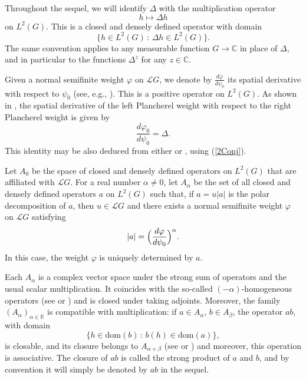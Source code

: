 \documentclass[12pt]{amsart}
\newcommand{\Cdb}{\mbox{$\mathbb{C}$}}
\theoremstyle{remark}
\theoremstyle{definition}
\numberwithin{equation}{section}
\begin{document}
Throughout the sequel, we will identify $\Delta$ with the multiplication operator 
\[
h \mapsto \Delta h
\] 
on $L^2(G)$. This is a closed and densely defined operator with domain 
\[
\{ h \in L^2(G) \,:\, \Delta h \in L^2(G) \}.
\] 
The same convention applies to any measurable function $G \to \Cdb$ in place of $\Delta$, and in particular to the functions $\Delta^z$ for any $z \in \Cdb$.

Given a normal semifinite weight $\varphi$ on $\mathcal{L}G$, we denote by 
\(
\frac{d\varphi}{d\psi_0}
\)
its spatial derivative with respect to $\psi_0$ (see, e.g., \cite[Definition 11.14]{Hiai}). This is a positive operator on $L^2(G)$. As shown in \cite[p. 551]{Terp2}, the spatial derivative of the left Plancherel weight with respect to the right Plancherel weight is given by
\begin{equation}\label{2Standard}
\frac{d\varphi_0}{d\psi_0} = \Delta.
\end{equation}
This identity may be also deduced from either \cite[Lemma 10]{Con} or \cite[Proposition 11.6]{Hiai}, using (\ref{2Conj}).

Let $A_0$ be the space of closed and densely defined operators on $L^2(G)$ that are affiliated with ${\mathcal L}G$. 
For a real number $\alpha \neq 0$, let $A_\alpha$ be the set of all closed and densely defined operators $a$ on $L^2(G)$ such that, if $a = u |a|$ is the polar decomposition of $a$, then $u \in {\mathcal L}G$ and there exists a normal semifinite weight $\varphi$ on ${\mathcal L}G$ satisfying
\begin{equation}\label{2A}
|a| = \Bigl( \frac{d\varphi}{d\psi_0} \Bigr)^\alpha.
\end{equation}
In this case, the weight $\varphi$ is uniquely determined by \(a\).

Each $A_\alpha$ is a complex vector space under the strong sum of operators and the usual scalar multiplication. 
It coincides with the so-called $(-\alpha)$-homogeneous operators (see \cite[Section 2]{Terp2} or \cite[pp.~202--203]{Hiai}) and is closed under taking adjoints. Moreover, the family \((A_\alpha)_{\alpha\in\mathbb{R}}\) is compatible with multiplication: if $a \in A_\alpha$, $b \in A_\beta$, the operator $ab$, with domain
\[
\{ h \in \mathrm{dom}(b) \,:\, b(h) \in \mathrm{dom}(a) \},
\] 
is closable, and its closure belongs to $A_{\alpha+\beta}$ (see \cite[Remark 2.2]{Terp2} or \cite[Lemma 2.4.2]{Vos}) and 
moreover, this operation is associative. The closure of $ab$ is called the strong product of $a$ and $b$, and by convention it will simply be denoted by $ab$ in the sequel. 
\end{document}
